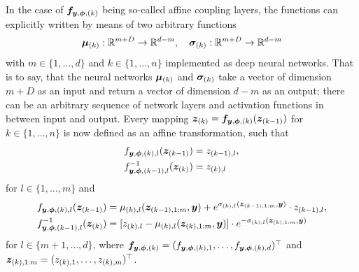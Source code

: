 \documentclass[a4paper,12pt]{report}
\begin{document}
In the case of $\bm{f}_{\bm{y},\bm{\phi},(k)}$ being so-called affine coupling layers, the functions can explicitly written by means of two arbitrary functions \begin{equation}
\bm{\mu}_{(k)}: \mathbb{R}^{m+D} \rightarrow \mathbb{R}^{d-m}, \quad \bm{\sigma}_{(k)}: \mathbb{R}^{m+D} \rightarrow \mathbb{R}^{d-m}
\end{equation} with $m \in \{1,\dots,d\}$ and $k \in \{1,\dots,n\}$ implemented as deep neural networks. That is to say, that the neural networks $\bm{\mu}_{(k)}$ and $\bm{\sigma}_{(k)}$ take a vector of dimension $m+D$ as an input and return a vector of dimension $d-m$ as an output; there can be an arbitrary sequence of network layers and activation functions in between input and output. Every mapping $\bm{z}_{(k)} = \bm{f}_{\bm{y},\bm{\phi},(k)}(\bm{z}_{(k-1)})$ for $k \in \{1,\dots,n\}$ is now defined as an affine transformation, such that \begin{align}
f_{\bm{y},\bm{\phi},(k),l}(\bm{z}_{(k-1)}) &= z_{(k-1),l}, \\
f_{\bm{y},\bm{\phi},(k-1),l}^{-1}(\bm{z}_{(k)}) &= 
z_{(k),l}
\end{align} for $l \in \{1,\dots,m\}$
and
\begin{align}
f_{\bm{y},\bm{\phi},(k),l}(\bm{z}_{(k-1)}) &= 
\mu_{(k),l}(\bm{z}_{(k-1),1:m},\bm{y}) + e^{\sigma_{(k),l}(\bm{z}_{(k-1),1:m},\bm{y})}\cdot z_{(k-1),l}, \\
f_{\bm{y},\bm{\phi},(k-1),l}^{-1}(\bm{z}_{(k)}) &= [z_{(k),l} - \mu_{(k),l}(\bm{z}_{(k),1:m},\bm{y})]\cdot  e^{-\sigma_{(k),l}(\bm{z}_{(k),1:m},\bm{y})}
\end{align} for $l \in \{m+1,\dots,d\}$, where $\bm{f}_{\bm{y},\bm{\phi},(k)} = (f_{\bm{y},\bm{\phi},(k),1},\dots,f_{\bm{y},\bm{\phi},(k),d})^\top$ and $\bm{z}_{(k),1:m} = (z_{(k),1},\dots, z_{(k),m})^\top$.
\end{document}
